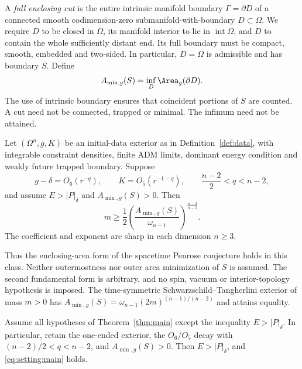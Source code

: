 \begin{definition}\label{def:fullcuts}
A \emph{full enclosing cut} is the entire intrinsic manifold boundary
$\Gamma=\partial D$ of a connected smooth codimension-zero
submanifold-with-boundary $D\subset\Omega$. We require $D$ to be
closed in $\Omega$, its manifold interior to lie in
$\operatorname{int}\Omega$, and $D$ to contain the whole sufficiently
distant end. Its full boundary must be compact, smooth, embedded and
two-sided. In particular, $D=\Omega$ is admissible and has boundary $S$.
Define
\begin{equation}\label{eq:setting:minarea}
 A_{\min,g}(S)=\inf_D\Area_g(\partial D).
\end{equation}
The use of intrinsic boundary ensures that coincident portions of $S$
are counted. A cut need not be connected, trapped or minimal. The
infimum need not be attained.
\end{definition}

\begin{theorem}\label{thm:main}
Let $(\Omega^n,g,K)$ be an initial-data exterior as in
Definition~\ref{def:data},
with integrable constraint densities, finite ADM limits, dominant
energy condition and weakly future trapped boundary. Suppose
\[
 g-\delta=O_6(r^{-q}),\qquad K=O_5(r^{-1-q}),\qquad
 \frac{n-2}{2}<q<n-2,
\]
and assume $E>|P|_\delta$ and $A_{\min,g}(S)>0$. Then
\begin{equation}\label{eq:setting:main}
 m\geq\frac12\left(\frac{A_{\min,g}(S)}{\omega_{n-1}}
                 \right)^{\frac{n-2}{n-1}}.
\end{equation}
The coefficient and exponent are sharp in each dimension $n\geq3$.
\end{theorem}

Thus the enclosing-area form of the spacetime Penrose conjecture holds
in this class. Neither outermostness nor outer area minimization of $S$
is assumed. The second fundamental form is arbitrary, and no spin,
vacuum or interior-topology hypothesis is imposed. The time-symmetric
Schwarzschild--Tangherlini exterior of mass $m>0$ has
$A_{\min,g}(S)=\omega_{n-1}(2m)^{(n-1)/(n-2)}$ and attains equality.

\begin{corollary}
\label{cor:automatic-timelikeness}
Assume all hypotheses of Theorem~\ref{thm:main} except the inequality
$E>|P|_\delta$. In particular, retain the one-ended exterior, the
$O_6/O_5$ decay with $(n-2)/2<q<n-2$, and $A_{\min,g}(S)>0$.
Then $E>|P|_\delta$, and \eqref{eq:setting:main} holds.
\end{corollary}

